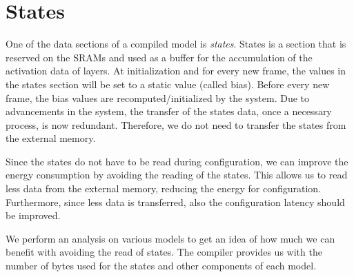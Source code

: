 \section{States}
One of the data sections of a compiled model is \textit{states}.
States is a section that is reserved on the SRAMs and used as a buffer for the accumulation of the activation data of layers.
At initialization and for every new frame, the values in the states section will be set to a static value (called bias).
Before every new frame, the bias values are recomputed/initialized by the system.
Due to advancements in the system, the transfer of the states data, once a necessary process, is now redundant.
Therefore, we do not need to transfer the states from the external memory.

Since the states do not have to be read during configuration, we can improve the energy consumption by avoiding the reading of the states.
This allows us to read less data from the external memory, reducing the energy for configuration.
Furthermore, since less data is transferred, also the configuration latency should be improved.

We perform an analysis on various models to get an idea of how much we can benefit with avoiding the read of states.
The compiler provides us with the number of bytes used for the states and other components of each model.

